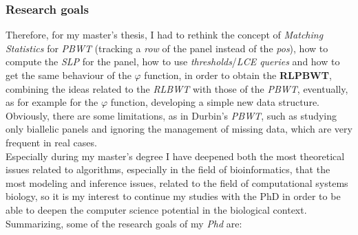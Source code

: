 \documentclass[a4paper,11pt, oneside]{article}
\begin{document}
\subsubsection*{Research goals}
Therefore, for my master's thesis, I had to rethink the concept of
\textit{Matching Statistics} for \textit{PBWT} (tracking  a \textit{row} of the
panel instead of the \textit{pos}), how to compute the \textit{SLP}
for the panel, how to use \textit{thresholds}/\textit{LCE queries} and how to
get the same behaviour of the $\varphi$ function, in order to obtain the
\textbf{RLPBWT}, combining the ideas related to the \textit{RLBWT} with those of
the \textit{PBWT}, eventually, as for example for the $\varphi$ function,
developing a simple new data structure.\\  
Obviously, there are some limitations, as in Durbin's \textit{PBWT}, such as
studying only biallelic panels and ignoring the management of missing data,
which are very frequent in real cases. \\
Especially during my master’s degree I have deepened both the most theoretical
issues related to algorithms, especially in the field of bioinformatics, that
the most modeling and inference issues, related to the field of computational
systems biology, so it is my interest to continue my studies with the PhD
in order to be able to deepen the computer science potential in the biological
context. Summarizing, some of the research goals of my \textit{Phd} are:
\end{document}
